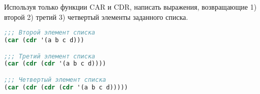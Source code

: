 Используя только функции CAR и CDR, написать выражения,
возвращающие 1) второй 2) третий 3) четвертый элементы заданного списка.

\begin{lstlisting}[language=Lisp]
;;; Второй элемент списка
(car (cdr '(a b c d)))

;;; Третий элемент списка
(car (cdr (cdr '(a b c d))))

;;; Четвертый элемент списка
(car (cdr (cdr (cdr '(a b c d)))))
\end{lstlisting}


